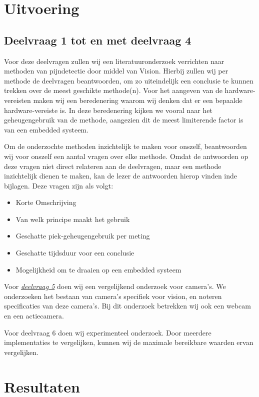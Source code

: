 \documentclass[11pt]{article}
\begin{document}
    \section{Uitvoering}\label{sec:uitvoering}
    \subsection{Deelvraag 1 tot en met deelvraag 4}\label{subsec:deelvraag-1-tot-en-met-deelvraag-4}
    Voor deze deelvragen zullen wij een literatuuronderzoek
    verrichten naar methoden van pijndetectie door middel van Vision.
    Hierbij zullen wij per methode de deelvragen beantwoorden, om zo uiteindelijk een conclusie te kunnen trekken over
    de meest geschikte methode(n).
    Voor het aangeven van de hardware-vereisten maken wij een beredenering waarom wij denken dat er een bepaalde hardware-vereiste is.
    In deze beredenering kijken we vooral naar het geheugengebruik van de methode,
    aangezien dit de meest limiterende factor is van een embedded systeem.

    Om de onderzochte methoden inzichtelijk te maken voor onszelf, beantwoorden wij voor onszelf een aantal vragen over elke methode.
    Omdat de antwoorden op deze vragen niet direct relateren aan de deelvragen, maar een methode inzichtelijk dienen te maken, kan de lezer de antwoorden hierop vinden inde bijlagen.
    Deze vragen zijn als volgt:
    \begin{itemize}
        \item Korte Omschrijving
        \item Van welk principe maakt het gebruik
        \item Geschatte piek-geheugengebruik per meting
        \item Geschatte tijdsduur voor een conclusie
        \item Mogelijkheid om te draaien op een embedded systeem
    \end{itemize}


    Voor \emph{\hyperref[itm:dv1]{deelvraag 5}} doen wij een vergelijkend onderzoek voor camera's.
    We onderzoeken het bestaan van camera's specifiek voor vision, en noteren specificaties van deze camera's.
    Bij dit onderzoek betrekken wij ook een webcam en een actiecamera.

    Voor deelvraag 6 doen wij experimenteel onderzoek.
    Door meerdere implementaties te vergelijken, kunnen wij de maximale bereikbare waarden ervan vergelijken.


    \section{Resultaten}\label{sec:resultaten}
\end{document}

